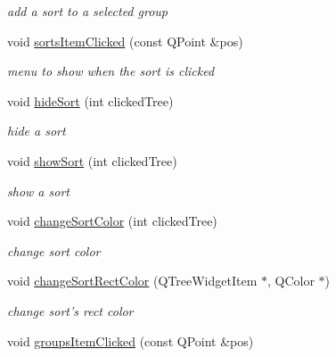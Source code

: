 \begin{DoxyCompactItemize}
\begin{DoxyCompactList}\small\item\em add a sort to a selected group \end{DoxyCompactList}\item 
\hypertarget{classTreeArea_a8a8afdc75c8e16720f9dde739d1f53e0}{void \hyperlink{classTreeArea_a8a8afdc75c8e16720f9dde739d1f53e0}{sorts\+Item\+Clicked} (const Q\+Point \&pos)}\label{classTreeArea_a8a8afdc75c8e16720f9dde739d1f53e0}

\begin{DoxyCompactList}\small\item\em menu to show when the sort is clicked \end{DoxyCompactList}\item 
void \hyperlink{classTreeArea_ad8651281efec4086ec668b43f1d528d9}{hide\+Sort} (int clicked\+Tree)
\begin{DoxyCompactList}\small\item\em hide a sort \end{DoxyCompactList}\item 
void \hyperlink{classTreeArea_a89ea1654d33d7d83a7bbb8b3a79b60ad}{show\+Sort} (int clicked\+Tree)
\begin{DoxyCompactList}\small\item\em show a sort \end{DoxyCompactList}\item 
void \hyperlink{classTreeArea_a5277c42469c5dab4cc117441ed2d872a}{change\+Sort\+Color} (int clicked\+Tree)
\begin{DoxyCompactList}\small\item\em change sort color \end{DoxyCompactList}\item 
\hypertarget{classTreeArea_a5eb847a42ee5dbcdbfc8d419b322197e}{void \hyperlink{classTreeArea_a5eb847a42ee5dbcdbfc8d419b322197e}{change\+Sort\+Rect\+Color} (Q\+Tree\+Widget\+Item $\ast$, Q\+Color $\ast$)}\label{classTreeArea_a5eb847a42ee5dbcdbfc8d419b322197e}

\begin{DoxyCompactList}\small\item\em change sort's rect color \end{DoxyCompactList}\item 
\hypertarget{classTreeArea_a1a3c713057c8aee75749706af8ad3cf6}{void \hyperlink{classTreeArea_a1a3c713057c8aee75749706af8ad3cf6}{groups\+Item\+Clicked} (const Q\+Point \&pos)}\label{classTreeArea_a1a3c713057c8aee75749706af8ad3cf6}


\end{DoxyCompactItemize}
